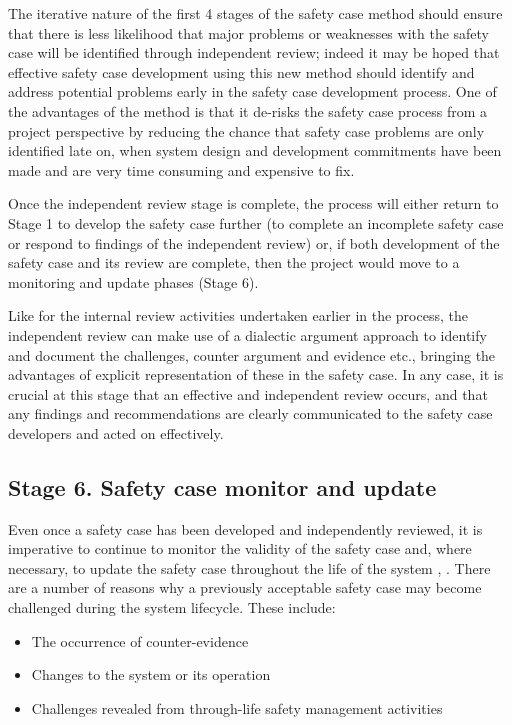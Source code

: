 The iterative nature of the first 4 stages of the safety case method should ensure that there is less likelihood that major problems or weaknesses with the safety case will be identified through independent review; indeed it may be hoped that effective safety case development using this new method should identify and address potential problems early in the safety case development process. One of the advantages of the method is that it de-risks the safety case process from a project perspective by reducing the chance that safety case problems are only identified late on, when system design and development commitments have been made and are very time consuming and expensive to fix.

Once the independent review stage is complete, the process will either return to Stage 1 to develop the safety case further (to complete an incomplete safety case or respond to findings of the independent review) or, if both development of the safety case and its review are complete, then the project would move to a monitoring and update phases (Stage 6).

Like for the internal review activities undertaken earlier in the process, the independent review can make use of a dialectic argument approach to identify and document the challenges, counter argument and evidence etc., bringing the advantages of explicit representation of these in the safety case. In any case, it is crucial at this stage that an effective and independent review occurs, and that any findings and recommendations are clearly communicated to the safety case developers and acted on effectively.


\subsection{Stage 6. Safety case monitor and update}

Even once a safety case has been developed and independently reviewed, it is imperative to continue to monitor the validity of the safety case and, where necessary, to update the safety case throughout the life of the system \cite{papadopoulos2000safety}, \cite{denney2015dynamic}. There are a number of reasons why a previously acceptable safety case may become challenged during the system lifecycle. These include:

\begin{itemize}
    \item The occurrence of counter-evidence
    \item Changes to the system or its operation
    \item Challenges revealed from through-life safety management activities
\end{itemize}

